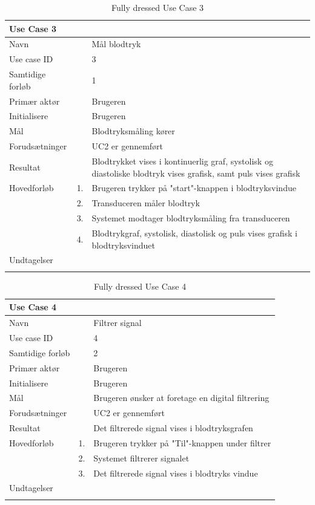 \begin{longtabu} to  %
    {\large \textbf{Use Case 3}} && \\
    \toprule
    Navn &&    Mål blodtryk\\
    Use case ID &&    3\\
    Samtidige forløb &&    1\\
    Primær aktør &&    Brugeren\\
    Initialisere &&    Brugeren\\
    Mål && Blodtryksmåling kører\\
    Forudsætninger && UC2 er gennemført\\
    Resultat &&    Blodtrykket vises i kontinuerlig graf, systolisk og diastoliske blodtryk vises grafisk, samt puls vises grafisk                     \\ \midrule
    Hovedforløb &    1. &    Brugeren trykker på "start"\--knappen i blodtryksvindue\\
    			& 	 2. & Transduceren måler blodtryk\\
    			&	 3. & Systemet modtager blodtryksmåling fra transduceren\\
    			& 	 4. & Blodtrykgraf, systolisk, diastolisk og puls vises grafisk i blodtryksvinduet\\ \midrule               
    Undtagelser &     &  \\ \bottomrule
\caption{Fully dressed Use Case 3}
\label{UC3}
\end{longtabu}

\begin{longtabu} to  %
    {\large \textbf{Use Case 4}} && \\
    \toprule
    Navn &&    Filtrer signal\\
    Use case ID &&    4\\
    Samtidige forløb &&    2\\
    Primær aktør &&    Brugeren\\
    Initialisere &&    Brugeren\\
    Mål && Brugeren ønsker at foretage en digital filtrering\\
    Forudsætninger && UC2 er gennemført\\
    Resultat &&    Det filtrerede signal vises i blodtryksgrafen                    \\ \midrule
    Hovedforløb &    1. &    Brugeren trykker på "Til"\--knappen under filtrer\\
    			&	 2. & 	 Systemet filtrerer signalet\\
    			&	 3. 	&	 Det filtrerede signal vises i blodtryks vindue \\ \midrule               
    Undtagelser &    \\ \bottomrule
\caption{Fully dressed Use Case 4}
\label{UC4}
\end{longtabu}

